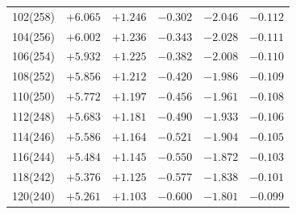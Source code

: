 \begin{table}[!h]
\begin{tabular}{crrrrr}
102(258) & $+6.065$ & $+1.246$ & $-0.302$ & $-2.046$ & $-0.112$\\
104(256) & $+6.002$ & $+1.236$ & $-0.343$ & $-2.028$ & $-0.111$\\
106(254) & $+5.932$ & $+1.225$ & $-0.382$ & $-2.008$ & $-0.110$\\
108(252) & $+5.856$ & $+1.212$ & $-0.420$ & $-1.986$ & $-0.109$\\
110(250) & $+5.772$ & $+1.197$ & $-0.456$ & $-1.961$ & $-0.108$\\
112(248) & $+5.683$ & $+1.181$ & $-0.490$ & $-1.933$ & $-0.106$\\
114(246) & $+5.586$ & $+1.164$ & $-0.521$ & $-1.904$ & $-0.105$\\
116(244) & $+5.484$ & $+1.145$ & $-0.550$ & $-1.872$ & $-0.103$\\
118(242) & $+5.376$ & $+1.125$ & $-0.577$ & $-1.838$ & $-0.101$\\
120(240) & $+5.261$ & $+1.103$ & $-0.600$ & $-1.801$ & $-0.099$\\
\end{tabular}
\end{table}

